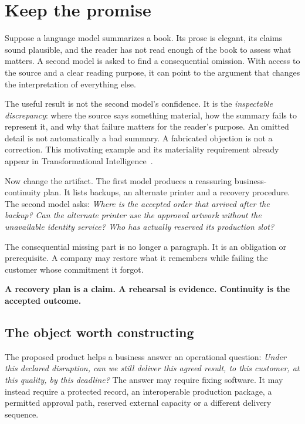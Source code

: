 \documentclass[11pt,a4paper]{article}
\newcommand{\ti}{Transformational Intelligence}
\newcommand{\chapterpage}{\clearpage}
\begin{document}
\chapterpage
\section{Keep the promise}\label{sec:promise}
Suppose a language model summarizes a book. Its prose is elegant, its claims sound plausible, and the reader has not read enough of the book to assess what matters. A second model is asked to find a consequential omission. With access to the source and a clear reading purpose, it can point to the argument that changes the interpretation of everything else.

The useful result is not the second model's confidence. It is the \emph{inspectable discrepancy}: where the source says something material, how the summary fails to represent it, and why that failure matters for the reader's purpose. An omitted detail is not automatically a bad summary. A fabricated objection is not a correction. This motivating example and its materiality requirement already appear in \ti\ \cite{boucherTI}.

Now change the artifact. The first model produces a reassuring business-continuity plan. It lists backups, an alternate printer and a recovery procedure. The second model asks: \emph{Where is the accepted order that arrived after the backup? Can the alternate printer use the approved artwork without the unavailable identity service? Who has actually reserved its production slot?}

The consequential missing part is no longer a paragraph. It is an obligation or prerequisite. A company may restore what it remembers while failing the customer whose commitment it forgot.

\begin{insight}
\textbf{A recovery plan is a claim. A rehearsal is evidence. Continuity is the accepted outcome.}
\end{insight}

\subsection{The object worth constructing}
The proposed product helps a business answer an operational question: \emph{Under this declared disruption, can we still deliver this agreed result, to this customer, at this quality, by this deadline?} The answer may require fixing software. It may instead require a protected record, an interoperable production package, a permitted approval path, reserved external capacity or a different delivery sequence.
\end{document}
